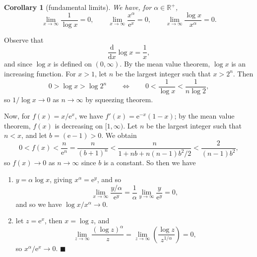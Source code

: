 \documentclass[letter-paper]{tufte-book}
\newtheorem{corollary}[theorem]{\color{pastel-blue}Corollary}
\newenvironment{proof}[1][Proof]{\begin{trivlist}
\item[\hskip \labelsep {\bfseries #1}]}{\end{trivlist}}
\newcommand{\ex}{\mathrm{e}}
\newcommand{\qed}{\hfill$\blacksquare$}
\begin{document}
\begin{corollary}[fundamental limits]
  We have, for $\alpha\in\mathbb{R}^+$,
  \begin{equation*}
    \lim_{x\to\infty}\frac{1}{\log x}=0, \qquad 
    \lim_{x\to\infty}\frac{x^\alpha}{\ex^x}=0,\qquad
    \lim_{x\to\infty}\frac{\log x}{x^\alpha}=0.
  \end{equation*}
\end{corollary}
\begin{proof}
  Observe that
  \begin{equation*}
    \frac{\mathrm{d}}{\mathrm{d}x}\log x=\frac{1}{x},
  \end{equation*}
  and since $\log x$ is defined on $(0,\infty)$. By the mean value theorem,
  $\log x$ is an increasing function. For $x>1$, let $n$ be the largest integer
  such that $x>2^n$. Then
  \begin{equation*}
    0>\log x>\log 2^n\qquad\Leftrightarrow\qquad
    0<\frac{1}{\log x}<\frac{1}{n\log 2},
  \end{equation*}
  so $1/\log x\to0$ as $n\to\infty$ by squeezing theorem.
  
  Now, for $f(x)=x/\ex^x$, we have $f'(x)=\ex^{-x}(1-x)$; by the mean value
  theorem, $f(x)$ is decreasing on $[1,\infty)$. Let $n$ be the largest integer
  such that $n<x$, and let $b=(\ex-1)>0$. We obtain
  \begin{equation*}
    0<f(x)<\frac{n}{\ex^n}=\frac{n}{(b+1)^n}<\frac{n}{1+nb+n(n-1)b^2/2}<
    \frac{2}{(n-1)b^2},
  \end{equation*}
  so $f(x)\to0$ as $n\to\infty$ since $b$ is a constant. So then we have
  \begin{enumerate}
    \item $y=\alpha\log x$, giving $x^\alpha=\ex^y$, and so
    \begin{equation*}
      \lim_{x\to\infty}\frac{y/\alpha}{\ex^y}=\frac{1}{\alpha}\lim_{y\to\infty}
      \frac{y}{\ex^y}=0,
    \end{equation*}
    and so we have $\log x/x^\alpha\to0$.
    
    \item let $z=\ex^x$, then $x=\log z$, and
    \begin{equation*}
      \lim_{z\to\infty}\frac{(\log z)^\alpha}{z}=\lim_{z\to\infty}
      \left(\frac{\log z}{z^{1/\alpha}}\right)=0,
    \end{equation*}
    so $x^\alpha/\ex^x\to0$. \qed
  \end{enumerate}
\end{proof}
\end{document}
